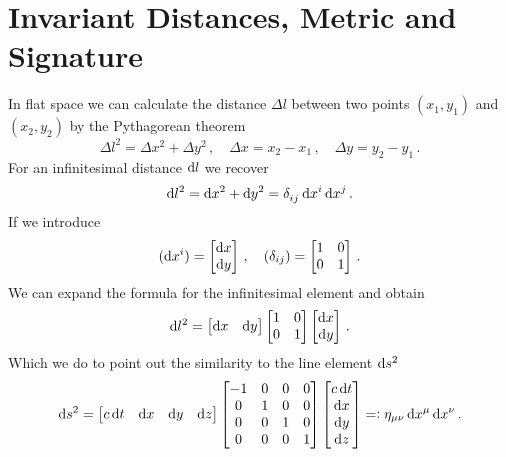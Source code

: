 \section{Invariant Distances, Metric and Signature}
In flat space we can calculate the distance $\Delta l$ between two points
$(x_1,y_1)$ and $(x_2,y_2)$ by the Pythagorean theorem
\begin{equation}
    \Delta l^2=\Delta x^2+\Delta y^2\, ,
    \quad \Delta x=x_2-x_1\,,\quad \Delta
    y=y_2-y_1\, .
\end{equation}
For an infinitesimal distance $\dif l$ we recover
\begin{equation}
    \dif l^2=\dif x^2+\dif y^2=\tensor{\delta}{_i_j}\dif x^i\dif x^j\, .
\end{equation}
If we introduce
\begin{equation}
    (\dif x^i)=\begin{bmatrix}
\dif x\\
\dif y
\end{bmatrix}\,,\quad (\delta_{ij})
=\begin{bmatrix}
1 & 0\\
0 & 1
\end{bmatrix}\, .
\end{equation}
We can expand the formula for the infinitesimal element and obtain
\begin{equation}
    \dif l^2=
    \begin{bmatrix}
        \dif x &
        \dif y
    \end{bmatrix}
    \begin{bmatrix}
        1 & 0\\
        0 & 1
    \end{bmatrix}
    \begin{bmatrix}
        \dif x\\
        \dif y
    \end{bmatrix}\, .
\end{equation}
Which we do to point out the similarity to the line element $\dif s^2$
\begin{equation}
    \dif s^2=
    \begin{bmatrix}
        c\dif t &
        \dif x &
        \dif y &
        \dif z
    \end{bmatrix}
    \begin{bmatrix}
        -1 & 0 & 0 & 0\\
        0  & 1 & 0 & 0\\
        0  & 0 & 1 & 0\\
        0  & 0 & 0 & 1\\
    \end{bmatrix}
    \begin{bmatrix}
        c\dif t\\
        \dif x\\
        \dif y\\
        \dif z\\
    \end{bmatrix}=:\eta_{\mu\nu}\dif x^\mu\dif x^\nu\, .
\end{equation}
